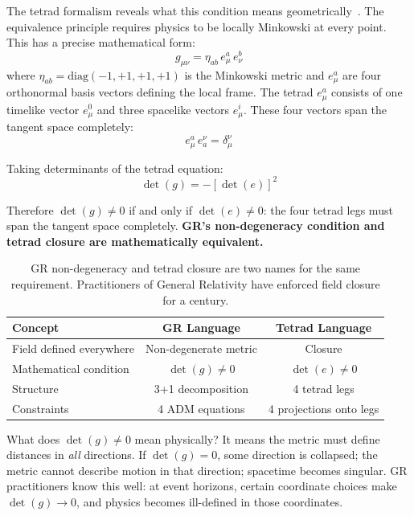 \documentclass[aps,prd,preprint,superscriptaddress,showpacs,preprintnumbers,amsmath,amssymb,nofootinbib]{revtex4-2}
\begin{document}
The tetrad formalism reveals what this condition means geometrically~\cite{mtw1973,wald1984}. The equivalence principle requires physics to be locally Minkowski at every point. This has a precise mathematical form:
\begin{equation}
g_{\mu\nu} = \eta_{ab}\, e^a_\mu\, e^b_\nu
\label{eq:tetrad}
\end{equation}
where $\eta_{ab} = \text{diag}(-1, +1, +1, +1)$ is the Minkowski metric and $e^a_\mu$ are four orthonormal basis vectors defining the local frame. The tetrad $e^a_\mu$ consists of one timelike vector $e^0_\mu$ and three spacelike vectors $e^i_\mu$. These four vectors span the tangent space completely:
\begin{equation}
e^a_\mu\, e_a^\nu = \delta_\mu^\nu
\end{equation}

Taking determinants of the tetrad equation:
\begin{equation}
\det(g) = -[\det(e)]^2
\label{eq:det-relation}
\end{equation}

Therefore $\det(g) \neq 0$ if and only if $\det(e) \neq 0$: the four tetrad legs must span the tangent space completely. \textbf{GR's non-degeneracy condition and tetrad closure are mathematically equivalent.}

\begin{table}[H]
\centering
\begin{tabular*}{0.95\textwidth}{@{\extracolsep{\fill}} lcc @{}}
\toprule
\textbf{Concept} & \textbf{GR Language} & \textbf{Tetrad Language} \\
\midrule
Field defined everywhere & Non-degenerate metric & Closure \\
Mathematical condition & $\det(g) \neq 0$ & $\det(e) \neq 0$ \\
Structure & 3+1 decomposition & 4 tetrad legs \\
Constraints & 4 ADM equations & 4 projections onto legs \\
\bottomrule
\end{tabular*}
\caption{GR non-degeneracy and tetrad closure are two names for the same requirement. Practitioners of General Relativity have enforced field closure for a century.}
\label{tab:closure}
\end{table}

What does $\det(g) \neq 0$ mean physically? It means the metric must define distances in \emph{all} directions. If $\det(g) = 0$, some direction is collapsed; the metric cannot describe motion in that direction; spacetime becomes singular. GR practitioners know this well: at event horizons, certain coordinate choices make $\det(g) \to 0$, and physics becomes ill-defined in those coordinates.
\end{document}
